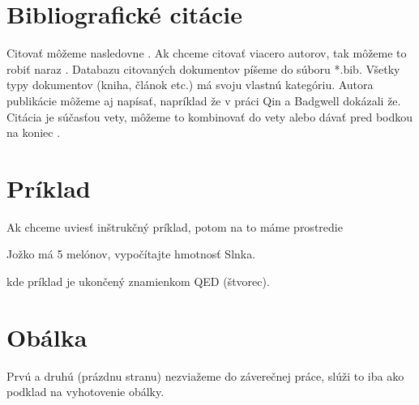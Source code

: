 \section{Bibliografické citácie}

Citovať môžeme nasledovne \cite{Eykhoff84}. Ak chceme citovať viacero autorov, tak môžeme to robiť naraz \cite{Fontes00,Eykhoff84}. Databazu citovaných dokumentov píšeme do súboru *.bib. Všetky typy dokumentov (kniha, článok etc.) má svoju vlastnú kategóriu. Autora publikácie môžeme aj napísať, napríklad že v práci Qin a Badgwell \cite{Qin99} dokázali že. Citácia je súčasťou vety, môžeme to kombinovať do vety \cite{Karny80} alebo dávať pred bodkou na koniec \cite{Far90}.

\section{Príklad}

Ak chceme uviesť inštrukčný príklad, potom na to máme prostredie
\begin{exmp}
Jožko má 5 melónov, vypočítajte hmotnosť Slnka.
\end{exmp}
kde príklad je ukončený znamienkom QED (štvorec).


\section{Obálka}

Prvú a druhú (prázdnu stranu) nezviažeme do záverečnej práce, slúži to iba ako podklad na vyhotovenie obálky.





